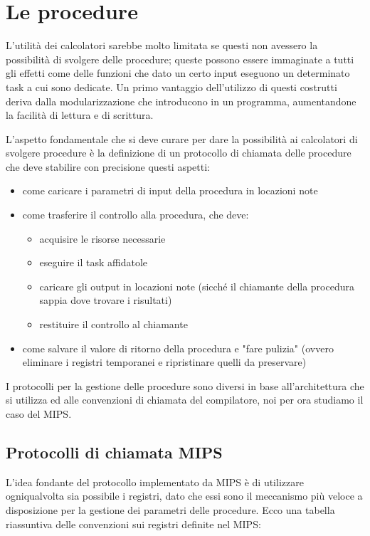 \documentclass[class=book, crop=false]{standalone}
\begin{document}

\section{Le procedure}
L'utilità dei calcolatori sarebbe molto limitata se questi non avessero la possibilità di svolgere delle procedure; queste possono essere immaginate a tutti gli effetti come delle funzioni che dato un certo input eseguono un determinato task a cui sono dedicate. Un primo vantaggio dell'utilizzo di questi costrutti deriva dalla modularizzazione che introducono in un programma, aumentandone la facilità di lettura e di scrittura.

L'aspetto fondamentale che si deve curare per dare la possibilità ai calcolatori di svolgere procedure è la definizione di un protocollo di chiamata delle procedure che deve stabilire con precisione questi aspetti:
\begin{itemize}[noitemsep]
	\item come caricare i parametri di input della procedura in locazioni note
	\item come trasferire il controllo alla procedura, che deve:
		\begin{itemize}[nolistsep, noitemsep]
			\item acquisire le risorse necessarie
			\item eseguire il task affidatole
			\item caricare gli output in locazioni note (sicché il chiamante della procedura sappia dove trovare i risultati)
			\item restituire il controllo al chiamante
		\end{itemize}
	\item come salvare il valore di ritorno della procedura e "fare pulizia"  (ovvero eliminare i registri temporanei  e ripristinare quelli da preservare)
\end{itemize}
I protocolli per la gestione delle procedure sono diversi in base all'architettura che si utilizza ed alle convenzioni di chiamata del compilatore, noi per ora studiamo il caso del MIPS.

\subsection{Protocolli di chiamata MIPS}
L'idea fondante del protocollo implementato da MIPS è di utilizzare ogniqualvolta sia possibile i registri, dato che essi sono il meccanismo più veloce a disposizione per la gestione dei parametri delle procedure. Ecco una tabella riassuntiva delle convenzioni sui registri definite nel MIPS:
\end{document}
